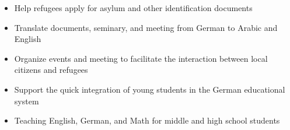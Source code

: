 

\begin{itemize}
    \item Help refugees apply for asylum and other identification documents
    \item Translate documents, seminary, and meeting from German to Arabic and English  
    \item Organize events and meeting to facilitate the interaction between local citizens and refugees
    \item Support the quick integration of young students in the German educational system
\end{itemize}

\begin{itemize}
    \item Teaching English, German, and Math for middle and high school students
\end{itemize}